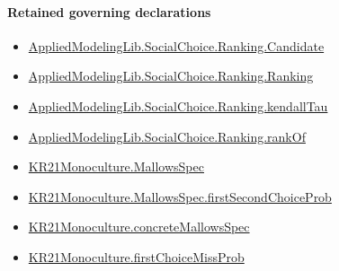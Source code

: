 \documentclass[10pt]{article}
\begin{document}
\paragraph{Retained governing declarations}
\begin{itemize}\raggedright
\item \hyperlink{library-prerequisite-8c0e6c25845ae78a}{Applied\allowbreak{}Modeling\allowbreak{}Lib.\allowbreak{}Social\allowbreak{}Choice.\allowbreak{}Ranking.\allowbreak{}Candidate}
\item \hyperlink{library-prerequisite-5cde54446d1ae021}{Applied\allowbreak{}Modeling\allowbreak{}Lib.\allowbreak{}Social\allowbreak{}Choice.\allowbreak{}Ranking.\allowbreak{}Ranking}
\item \hyperlink{governing-declaration-127efd44d176e2ba}{Applied\allowbreak{}Modeling\allowbreak{}Lib.\allowbreak{}Social\allowbreak{}Choice.\allowbreak{}Ranking.\allowbreak{}kendall\allowbreak{}Tau}
\item \hyperlink{governing-declaration-ef804e95c0f14f7c}{Applied\allowbreak{}Modeling\allowbreak{}Lib.\allowbreak{}Social\allowbreak{}Choice.\allowbreak{}Ranking.\allowbreak{}rank\allowbreak{}Of}
\item \hyperlink{governing-declaration-b2e6ec0602659b07}{KR21\allowbreak{}Monoculture.\allowbreak{}Mallows\allowbreak{}Spec}
\item \hyperlink{governing-declaration-5112f3183beb09fd}{KR21\allowbreak{}Monoculture.\allowbreak{}Mallows\allowbreak{}Spec.\allowbreak{}first\allowbreak{}Second\allowbreak{}Choice\allowbreak{}Prob}
\item \hyperlink{governing-declaration-0e399c7dd166853c}{KR21\allowbreak{}Monoculture.\allowbreak{}concrete\allowbreak{}Mallows\allowbreak{}Spec}
\item \hyperlink{governing-declaration-82b022e0663ac01d}{KR21\allowbreak{}Monoculture.\allowbreak{}first\allowbreak{}Choice\allowbreak{}Miss\allowbreak{}Prob}
\end{itemize}
\end{document}
